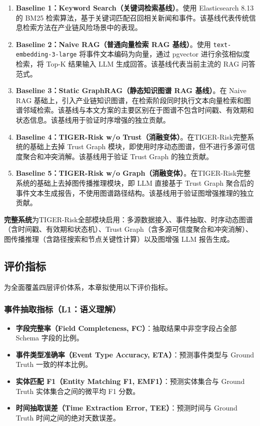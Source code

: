 \documentclass[12pt,a4paper]{article}
\newcommand{\projectshort}{TIGER-Risk}
\newcommand{\term}[1]{\textbf{#1}}
\begin{document}
\begin{enumerate}
    \item \term{Baseline 1：Keyword Search（关键词检索基线）}。使用 Elasticsearch 8.13 的 BM25 检索算法，基于关键词匹配召回相关新闻和事件。该基线代表传统信息检索方法在产业链风险场景中的表现。
    \item \term{Baseline 2：Naive RAG（普通向量检索 RAG 基线）}。使用 \texttt{text-embedding-3-large} 将事件文本编码为向量，通过 pgvector 进行余弦相似度检索，将 Top-K 结果输入 LLM 生成回答。该基线代表当前主流的 RAG 问答范式。
    \item \term{Baseline 3：Static GraphRAG（静态知识图谱 RAG 基线）}。在 Naive RAG 基础上，引入产业链知识图谱，在检索阶段同时执行文本向量检索和图谱邻域检索。该基线与本文方案的主要区别在于图谱不包含时间戳、有效期和状态信息。该基线用于验证时序增强的独立贡献。
    \item \term{Baseline 4：TIGER-Risk w/o Trust（消融变体）}。在\projectshort 完整系统的基础上去掉 Trust Graph 模块，即使用时序动态图谱，但不进行多源可信度聚合和冲突消解。该基线用于验证 Trust Graph 的独立贡献。
    \item \term{Baseline 5：TIGER-Risk w/o Graph（消融变体）}。在\projectshort 完整系统的基础上去掉图传播推理模块，即 LLM 直接基于 Trust Graph 聚合后的事件文本生成报告，不使用图谱路径结构。该基线用于验证图增强推理的独立贡献。
\end{enumerate}

\textbf{完整系统}为\projectshort 全部模块启用：多源数据接入、事件抽取、时序动态图谱（含时间戳、有效期和状态机）、Trust Graph（含多源可信度聚合和冲突消解）、图传播推理（含路径搜索和节点关键性计算）以及图增强 LLM 报告生成。

\subsection{评价指标}
\label{sec:exp-metrics}

为全面覆盖四层评价体系，本章拟使用以下评价指标。

\subsubsection{事件抽取指标（L1：语义理解）}

\begin{itemize}
    \item \term{字段完整率（Field Completeness, FC）}：抽取结果中非空字段占全部 Schema 字段的比例。
    \item \term{事件类型准确率（Event Type Accuracy, ETA）}：预测事件类型与 Ground Truth 一致的样本比例。
    \item \term{实体匹配 F1（Entity Matching F1, EMF1）}：预测实体集合与 Ground Truth 实体集合之间的微平均 F1 分数。
    \item \term{时间抽取误差（Time Extraction Error, TEE）}：预测时间与 Ground Truth 时间之间的绝对天数误差。
\end{itemize}
\end{document}

